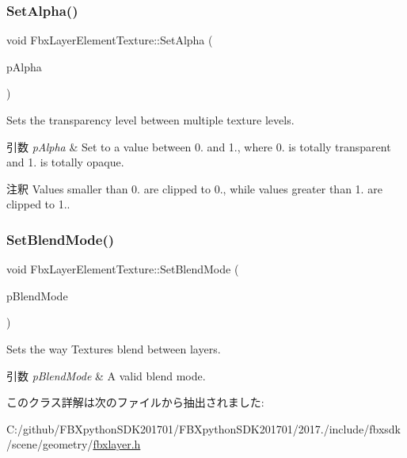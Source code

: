 \subsubsection{\texorpdfstring{Set\+Alpha()}{SetAlpha()}}
{\footnotesize\ttfamily void Fbx\+Layer\+Element\+Texture\+::\+Set\+Alpha (\begin{DoxyParamCaption}\item[{double}]{p\+Alpha }\end{DoxyParamCaption})}

Sets the transparency level between multiple texture levels. 
\begin{DoxyParams}{引数}
{\em p\+Alpha} & Set to a value between 0. and 1., where 0. is totally transparent and 1. is totally opaque. \\
\hline
\end{DoxyParams}
\begin{DoxyRemark}{注釈}
Values smaller than 0. are clipped to 0., while values greater than 1. are clipped to 1.. 
\end{DoxyRemark}
\mbox{\label{class_fbx_layer_element_texture_ac10e1c4ab20077c963b8d097f867ee53}} 
\subsubsection{\texorpdfstring{Set\+Blend\+Mode()}{SetBlendMode()}}
{\footnotesize\ttfamily void Fbx\+Layer\+Element\+Texture\+::\+Set\+Blend\+Mode (\begin{DoxyParamCaption}\item[{\hyperlink{class_fbx_layer_element_texture_a95d9277da243733eae14d4d0141f77ea}{E\+Blend\+Mode}}]{p\+Blend\+Mode }\end{DoxyParamCaption})}

Sets the way Textures blend between layers. 
\begin{DoxyParams}{引数}
{\em p\+Blend\+Mode} & A valid blend mode. \\
\hline
\end{DoxyParams}


このクラス詳解は次のファイルから抽出されました\+:\begin{DoxyCompactItemize}
\item 
C\+:/github/\+F\+B\+Xpython\+S\+D\+K201701/\+F\+B\+Xpython\+S\+D\+K201701/2017./include/fbxsdk/scene/geometry/\hyperlink{fbxlayer_8h}{fbxlayer.\+h}\end{DoxyCompactItemize}
